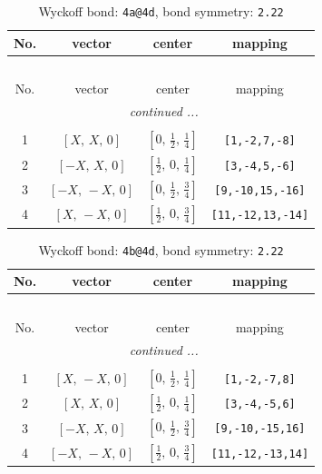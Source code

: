 \documentclass[fleqn,8pt]{jsarticle}
\begin{document}
\begin{longtable}{cccc}
\caption{Wyckoff bond: {\tt 4a@4d}, bond symmetry: {\tt 2.22}}
 \\
 \hline \hline
No. & vector & center & mapping \\ \hline \endfirsthead

\multicolumn{3}{l}{\tablename\ \thetable{}} \\
 \hline \hline
No. & vector & center & mapping \\ \hline \endhead

 \hline \hline
\multicolumn{3}{r}{\footnotesize\it continued ...} \\ \endfoot

 \hline \hline
\multicolumn{3}{r}{} \\ \endlastfoot

1 & $\left[ X,\, X,\, 0 \right]$ & $\left[ 0,\, \frac{1}{2},\, \frac{1}{4} \right]$ & {\tt [1,-2,7,-8]} \\ \hline
2 & $\left[ - X,\, X,\, 0 \right]$ & $\left[ \frac{1}{2},\, 0,\, \frac{1}{4} \right]$ & {\tt [3,-4,5,-6]} \\ \hline
3 & $\left[ - X,\, - X,\, 0 \right]$ & $\left[ 0,\, \frac{1}{2},\, \frac{3}{4} \right]$ & {\tt [9,-10,15,-16]} \\ \hline
4 & $\left[ X,\, - X,\, 0 \right]$ & $\left[ \frac{1}{2},\, 0,\, \frac{3}{4} \right]$ & {\tt [11,-12,13,-14]} \\
\end{longtable}
\renewcommand{\arraystretch}{1.2}
\begin{longtable}{cccc}
\caption{Wyckoff bond: {\tt 4b@4d}, bond symmetry: {\tt 2.22}}
 \\
 \hline \hline
No. & vector & center & mapping \\ \hline \endfirsthead

\multicolumn{3}{l}{\tablename\ \thetable{}} \\
 \hline \hline
No. & vector & center & mapping \\ \hline \endhead

 \hline \hline
\multicolumn{3}{r}{\footnotesize\it continued ...} \\ \endfoot

 \hline \hline
\multicolumn{3}{r}{} \\ \endlastfoot

1 & $\left[ X,\, - X,\, 0 \right]$ & $\left[ 0,\, \frac{1}{2},\, \frac{1}{4} \right]$ & {\tt [1,-2,-7,8]} \\ \hline
2 & $\left[ X,\, X,\, 0 \right]$ & $\left[ \frac{1}{2},\, 0,\, \frac{1}{4} \right]$ & {\tt [3,-4,-5,6]} \\ \hline
3 & $\left[ - X,\, X,\, 0 \right]$ & $\left[ 0,\, \frac{1}{2},\, \frac{3}{4} \right]$ & {\tt [9,-10,-15,16]} \\ \hline
4 & $\left[ - X,\, - X,\, 0 \right]$ & $\left[ \frac{1}{2},\, 0,\, \frac{3}{4} \right]$ & {\tt [11,-12,-13,14]} \\
\end{longtable}
\end{document}
